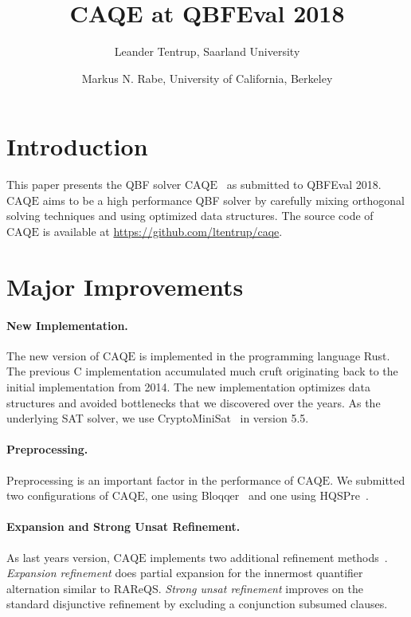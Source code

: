 \documentclass[11pt,twocolumn]{article}
\title{CAQE at QBFEval 2018}
\author{Leander Tentrup, Saarland University \and Markus N. Rabe, University of California, Berkeley}
\date{}
\newcommand{\caqe}{\text{CAQE}}
\begin{document}
\maketitle
  
\section{Introduction}

This paper presents the QBF solver $\caqe$~\cite{conf/fmcad/RabeT15} as submitted to QBFEval 2018.
$\caqe$ aims to be a high performance QBF solver by carefully mixing orthogonal solving techniques and using optimized data structures.
The source code of $\caqe$ is available at \url{https://github.com/ltentrup/caqe}.

\section{Major Improvements}

\paragraph{New Implementation.}

The new version of $\caqe$ is implemented in the programming language Rust.
The previous C implementation accumulated much cruft originating back to the initial implementation from 2014.
The new implementation optimizes data structures and avoided bottlenecks that we discovered over the years.
As the underlying SAT solver, we use CryptoMiniSat~\cite{conf/sat/SoosNC09} in version 5.5.

\paragraph{Preprocessing.}

Preprocessing is an important factor in the performance of $\caqe$.
We submitted two configurations of $\caqe$, one using Bloqqer~\cite{conf/cade/BiereLS11} and one using HQSPre~\cite{conf/tacas/WimmerRM017}.

\paragraph{Expansion and Strong Unsat Refinement.}

As last years version, $\caqe$ implements two additional refinement methods~\cite{conf/cav/Tentrup17}.
\emph{Expansion refinement} does partial expansion for the innermost quantifier alternation similar to RAReQS.
\emph{Strong unsat refinement} improves on the standard disjunctive refinement by excluding a conjunction subsumed clauses.
\end{document}
